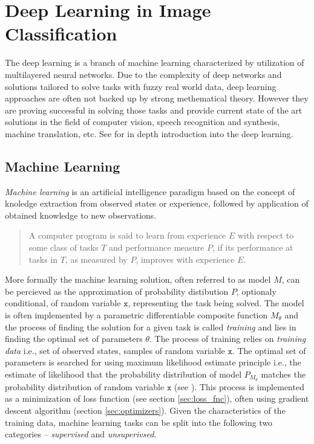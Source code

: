\section{Deep Learning in Image Classification}
\label{sec:deep_learning}
The deep learning is a branch of machine learning characterized by utilization of multilayered neural networks. Due to the complexity of deep networks and solutions tailored to solve tasks with fuzzy real world data, deep learning approaches are often not backed up by strong methematical theory. However they are proving successful in solving those tasks and provide current state of the art solutions in the field of computer vision, speech recognition and synthesis, machine translation, etc. See \cite{Goodfellow-et-al-2016} for in depth introduction into the deep learning.

\subsection{Machine Learning}
\emph{Machine learning} is an artificial intelligence paradigm based on the concept of knoledge extraction from observed states or experience, followed by application of obtained knowledge to new observations.

\begin{quotation}
A computer program is said to learn from experience $E$ with respect to some class of tasks $T$ and performance measure $P$, if its performance at tasks in $T$, as measured by $P$, improves with experience $E$. \cite{Mitchell-1997}
\end{quotation}

\noindent More formally the machine learning solution, often referred to as model $M$, can be percieved as the approximation of probability distibution $P$, optionaly conditional, of random variable $\mathtt{x}$, representing the task being solved. The model is often implemented by a parametric differentiable composite function $M_\theta$ and the process of finding the solution for a given task is called \emph{training} and lies in finding the optimal set of parameters $\theta$. The process of training relies on \emph{training data} i.e., set of observed states, samples of random variable $\mathtt{x}$. The optimal set of parameters is searched for using maximum likelihood estimate principle i.e., the estimate of likelihood that the probability distribution of model $P_{M_\theta}$ matches the probability distribution of random variable $\mathtt{x}$ (see \cite{ml_flach}). This process is implemented as a minimization of loss function (see section \ref{sec:loss_fnc}), often using gradient descent algorithm (section \ref{sec:optimizers}). Given the characteristics of the training data, machine learning tasks can be split into the following two categories -- \emph{supervised} and \emph{unsuperivsed}.

